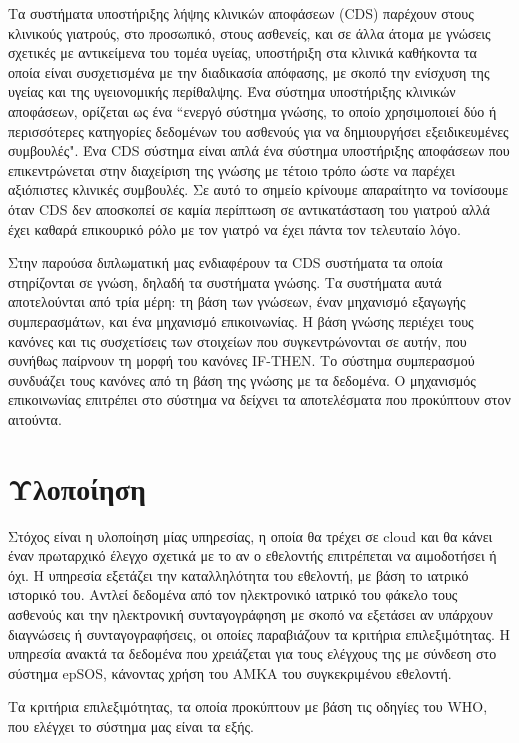 		Τα συστήματα υποστήριξης λήψης κλινικών αποφάσεων (CDS) παρέχουν στους κλινικούς γιατρούς, στο προσωπικό, στους ασθενείς, και σε άλλα άτομα με γνώσεις σχετικές με αντικείμενα του τομέα υγείας, υποστήριξη στα κλινικά καθήκοντα τα οποία είναι συσχετισμένα με την διαδικασία απόφασης, με σκοπό  την ενίσχυση της υγείας και της υγειονομικής περίθαλψης\cite{clinicalDecision}. Ένα σύστημα υποστήριξης κλινικών αποφάσεων, ορίζεται ως ένα ``ενεργό σύστημα γνώσης, το οποίο χρησιμοποιεί δύο ή περισσότερες κατηγορίες δεδομένων του ασθενούς για να δημιουργήσει εξειδικευμένες συμβουλές". Ένα CDS σύστημα είναι απλά ένα σύστημα υποστήριξης αποφάσεων που επικεντρώνεται στην διαχείριση της γνώσης με τέτοιο τρόπο ώστε να παρέχει αξιόπιστες κλινικές συμβουλές. Σε αυτό το σημείο κρίνουμε απαραίτητο να τονίσουμε όταν CDS δεν αποσκοπεί σε καμία περίπτωση σε αντικατάσταση του γιατρού αλλά έχει καθαρά επικουρικό ρόλο με τον γιατρό να έχει πάντα τον τελευταίο λόγο\cite{miller}. 
		
		Στην παρούσα διπλωματική μας ενδιαφέρουν τα CDS συστήματα τα οποία στηρίζονται σε γνώση, δηλαδή τα συστήματα γνώσης. Τα συστήματα αυτά αποτελούνται από τρία μέρη: τη βάση των γνώσεων, έναν μηχανισμό εξαγωγής συμπερασμάτων, και ένα μηχανισμό επικοινωνίας. Η βάση γνώσης περιέχει τους κανόνες και τις συσχετίσεις των στοιχείων που συγκεντρώνονται σε αυτήν, που συνήθως παίρνουν τη μορφή του κανόνες IF-THEN. Το σύστημα συμπερασμού συνδυάζει τους κανόνες από τη βάση της γνώσης με τα δεδομένα. Ο μηχανισμός επικοινωνίας επιτρέπει στο σύστημα να δείχνει τα αποτελέσματα που προκύπτουν στον αιτούντα.
		
\section{Υλοποίηση}


		Στόχος είναι η υλοποίηση μίας υπηρεσίας, η οποία θα τρέχει σε cloud και θα κάνει έναν πρωταρχικό έλεγχο σχετικά με το αν ο εθελοντής επιτρέπεται να αιμοδοτήσει ή όχι. Η υπηρεσία εξετάζει την καταλληλότητα του εθελοντή, με βάση το ιατρικό ιστορικό του. Αντλεί δεδομένα από τον ηλεκτρονικό ιατρικό του φάκελο τους ασθενούς και την ηλεκτρονική συνταγογράφηση με σκοπό να εξετάσει αν υπάρχουν διαγνώσεις ή συνταγογραφήσεις, οι οποίες παραβιάζουν τα κριτήρια επιλεξιμότητας. Η υπηρεσία ανακτά τα δεδομένα που χρειάζεται για τους ελέγχους της με σύνδεση στο σύστημα epSOS, κάνοντας χρήση του ΑΜΚΑ του συγκεκριμένου εθελοντή.
		
		Τα κριτήρια επιλεξιμότητας, τα οποία προκύπτουν με βάση τις οδηγίες του WHO, \cite{safety} που ελέγχει το σύστημα μας είναι τα εξής.
		

